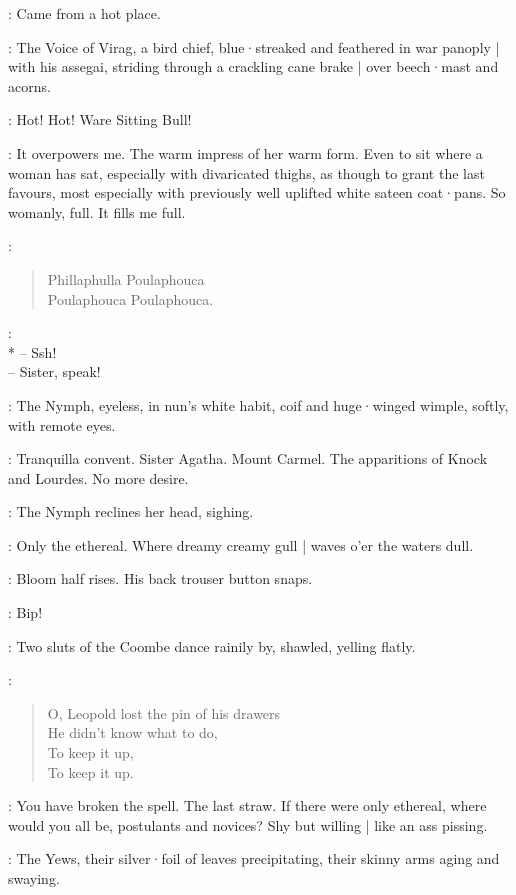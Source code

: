 \Zoe:
Came from a hot place.

:
The Voice of Virag,
%
a bird chief,
blue·streaked and feathered in war panoply |
with his assegai,
striding through a crackling cane brake |
over beech·mast and acorns.

\Virag:
Hot!
Hot!
Ware Sitting Bull!

\Bloom:
It overpowers me.
The warm impress of her warm form.
Even to sit where a woman has sat,
especially with divaricated thighs,
as though to grant the last favours,
most especially with previously well uplifted white sateen coat·pans.
So womanly,
full.
It fills me full.

\Waterfall[3b]:
\begin{verse}
    Phillaphulla Poulaphouca\\
%
    Poulaphouca Poulaphouca.
\end{verse}

\Yews[3b]:\\*
-- Ssh!\\
-- Sister, speak!

:
The Nymph,
eyeless,
in nun's white habit,
coif and huge·winged wimple,
softly,
with remote eyes.

\Nymph:
Tranquilla convent.
Sister Agatha.
Mount Carmel.
The apparitions of Knock and Lourdes.
No more desire.

:
The Nymph reclines her head,
sighing.

\Nymph:
Only the ethereal.
Where dreamy creamy gull |
waves o'er the waters dull.

:
Bloom half rises.
His back trouser button snaps.

\Button:
Bip!

:
Two sluts of the Coombe dance rainily by,
shawled,
yelling flatly.

\Sluts:
\begin{verse}
    O, Leopold lost the pin of his drawers\\
    He didn't know what to do,\\
    To keep it up,\\
    To keep it up.
\end{verse}

\Bloom:
You have broken the spell.
The last straw.
If there were only ethereal,
where would you all be,
postulants and novices?
%
Shy but willing |
like an ass pissing.

:
The Yews,
their silver·foil of leaves precipitating,
their skinny arms aging and swaying.

